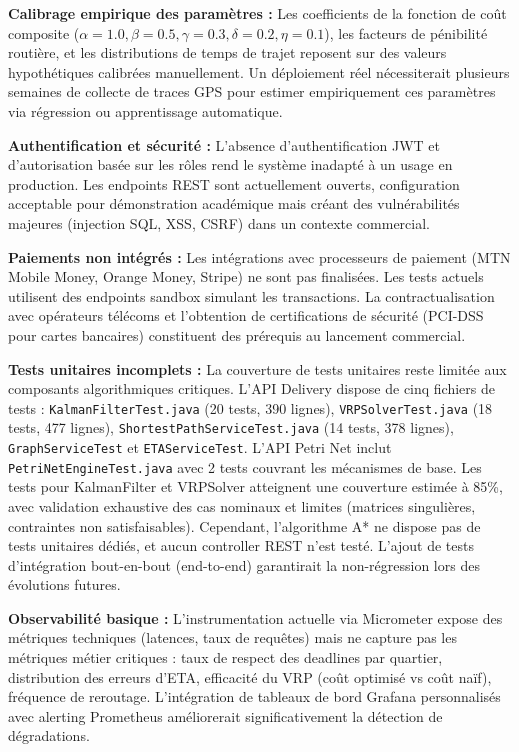\textbf{Calibrage empirique des paramètres :} Les coefficients de la fonction de coût composite ($\alpha=1.0, \beta=0.5, \gamma=0.3, \delta=0.2, \eta=0.1$), les facteurs de pénibilité routière, et les distributions de temps de trajet reposent sur des valeurs hypothétiques calibrées manuellement. Un déploiement réel nécessiterait plusieurs semaines de collecte de traces GPS pour estimer empiriquement ces paramètres via régression ou apprentissage automatique.

\textbf{Authentification et sécurité :} L'absence d'authentification JWT et d'autorisation basée sur les rôles rend le système inadapté à un usage en production. Les endpoints REST sont actuellement ouverts, configuration acceptable pour démonstration académique mais créant des vulnérabilités majeures (injection SQL, XSS, CSRF) dans un contexte commercial.

\textbf{Paiements non intégrés :} Les intégrations avec processeurs de paiement (MTN Mobile Money, Orange Money, Stripe) ne sont pas finalisées. Les tests actuels utilisent des endpoints sandbox simulant les transactions. La contractualisation avec opérateurs télécoms et l'obtention de certifications de sécurité (PCI-DSS pour cartes bancaires) constituent des prérequis au lancement commercial.

\textbf{Tests unitaires incomplets :} La couverture de tests unitaires reste limitée aux composants algorithmiques critiques. L'API Delivery dispose de cinq fichiers de tests : \texttt{KalmanFilterTest.java} (20 tests, 390 lignes), \texttt{VRPSolverTest.java} (18 tests, 477 lignes), \texttt{ShortestPathServiceTest.java} (14 tests, 378 lignes), \texttt{GraphServiceTest} et \texttt{ETAServiceTest}. L'API Petri Net inclut \texttt{PetriNetEngineTest.java} avec 2 tests couvrant les mécanismes de base. Les tests pour KalmanFilter et VRPSolver atteignent une couverture estimée à 85\%, avec validation exhaustive des cas nominaux et limites (matrices singulières, contraintes non satisfaisables). Cependant, l'algorithme A* ne dispose pas de tests unitaires dédiés, et aucun controller REST n'est testé. L'ajout de tests d'intégration bout-en-bout (end-to-end) garantirait la non-régression lors des évolutions futures.

\textbf{Observabilité basique :} L'instrumentation actuelle via Micrometer expose des métriques techniques (latences, taux de requêtes) mais ne capture pas les métriques métier critiques : taux de respect des deadlines par quartier, distribution des erreurs d'ETA, efficacité du VRP (coût optimisé vs coût naïf), fréquence de reroutage. L'intégration de tableaux de bord Grafana personnalisés avec alerting Prometheus améliorerait significativement la détection de dégradations.

